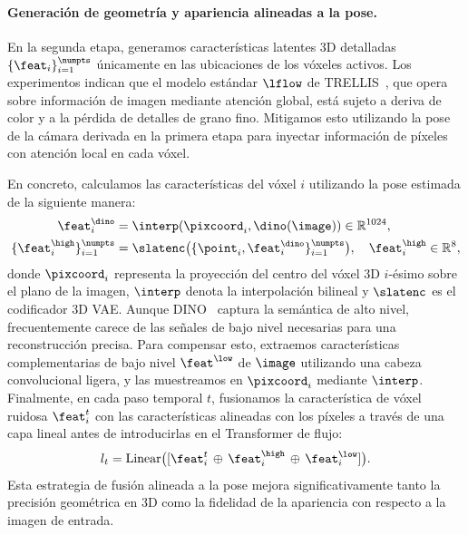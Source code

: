 \documentclass[../../book-main_es.tex]{subfiles}
\begin{document}


\paragraph{Generación de geometría y apariencia alineadas a la pose.}
En la segunda etapa, generamos características latentes 3D detalladas 
$\{ \feat_i \}_{i=1}^{\numpts}$ únicamente en las ubicaciones de los vóxeles activos. 
Los experimentos indican que el modelo estándar 
$\lflow$ de TRELLIS~\citep{xiang2025structured}, que opera sobre información de imagen mediante 
atención global, está sujeto a deriva de color y a la pérdida de detalles de grano fino.
Mitigamos esto utilizando la pose de la cámara derivada en la primera etapa para inyectar 
información de píxeles con atención local en cada vóxel.

En concreto, calculamos las características del vóxel $i$ utilizando la pose estimada de la siguiente manera:
\begin{equation}
\begin{aligned}
\feat^\dino_{i} &= \interp(\pixcoord_i, \dino(\image)) \in \mathbb{R}^{1024}, \\
\{\feat^{\high}_{i}\}_{i=1}^{\numpts} &= \slatenc\big(\{\point_i, \feat^\dino_i\}_{i=1}^{\numpts}\big), \quad \feat^{\high}_{i} \in \mathbb{R}^{8},
\end{aligned}
\label{eq:latent}
\end{equation}
donde $\pixcoord_i$ representa la proyección del centro del vóxel 3D $i$-ésimo sobre el 
plano de la imagen, $\interp$ denota la interpolación bilineal y $\slatenc$ es el codificador 
3D VAE. Aunque DINO~\citep{oquab2023dinov2} captura la semántica de alto nivel, frecuentemente carece 
de las señales de bajo nivel necesarias para una reconstrucción precisa. Para compensar esto, 
extraemos características complementarias de bajo nivel $\feat^{\low}$ de $\image$ utilizando 
una cabeza convolucional ligera, y las muestreamos en $\pixcoord_i$ mediante $\interp$. 
Finalmente, en cada paso temporal $t$, fusionamos la característica de vóxel ruidosa
$\feat_i^{t}$ con las características alineadas con los píxeles a través de una capa lineal 
antes de introducirlas en el Transformer de flujo:
\begin{equation}
l_t = \mathrm{Linear}\big([\feat_i^{t}\,\oplus\, \feat^{\high}_{i} \,\oplus\, \feat^{\low}_{i}]\big).
\end{equation}
Esta estrategia de fusión alineada a la pose mejora significativamente tanto la precisión 
geométrica en 3D como la fidelidad de la apariencia con respecto a la imagen de entrada.
\end{document}
